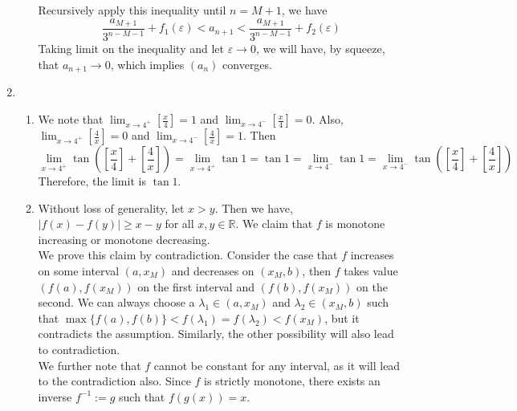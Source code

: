 \documentclass[12pt]{article}
\theoremstyle{definition}
\begin{document}
\begin{enumerate}
\begin{enumerate}
  Recursively apply this inequality until $n=M+1$, we have
  \[
\frac{a_{M+1}}{3^{n-M-1}}+f_1(\varepsilon)<a_{n+1}<\frac{a_{M+1}}{3^{n-M-1}}+f_2(\varepsilon)
  \]
  Taking limit on the inequality and let $\varepsilon\to 0$, we will have, by squeeze, that $a_{n+1}\to 0$, which implies $(a_n)$ converges.
  \end{enumerate}
  \item \begin{enumerate}
  \item We note that $\lim_{x\to4^+}\left[\frac{x}{4}\right]=1$ and $\lim_{x\to4^-}\left[\frac{x}{4}\right]=0$. Also, $\lim_{x\to4^+}\left[\frac{4}{x}\right]=0$ and $\lim_{x\to4^-}\left[\frac{4}{x}\right]=1$. Then 
  \[
\lim_{x\to4^+}\tan\left(\left[\frac{x}{4}\right]+\left[\frac{4}{x}\right]\right)=\lim_{x\to4^+}\tan 1 = \tan 1 =\lim_{x\to4^-} \tan 1 =\lim_{x\to4^-}\tan\left(\left[\frac{x}{4}\right]+\left[\frac{4}{x}\right]\right)
  \]
  Therefore, the limit is $\tan 1$.
  \item Without loss of generality, let $x>y$. Then we have, $|f(x)-f(y)|\geq x-y$ for all $x,y\in\mathbb{R}$. We claim that $f$ is monotone increasing or monotone decreasing. \\We prove this claim by contradiction. Consider the case that $f$ increases on some interval $(a,x_M)$ and decreases on $(x_M,b)$, then $f$ takes value $(f(a),f(x_M))$ on the first interval and $(f(b),f(x_M))$ on the second. We can always choose a $\lambda_1\in (a,x_M)$ and $\lambda_2\in(x_M,b)$ such that $\max\{f(a),f(b)\}<f(\lambda_1)=f(\lambda_2)<f(x_M)$, but it contradicts the assumption. Similarly, the other possibility will also lead to contradiction. \\ We further note that $f$ cannot be constant for any interval, as it will lead to the contradiction also. Since $f$ is strictly monotone, there exists an inverse $f^{-1}:=g$ such that $f(g(x))=x$. 
  \end{enumerate} 
\end{enumerate}
\end{document}
